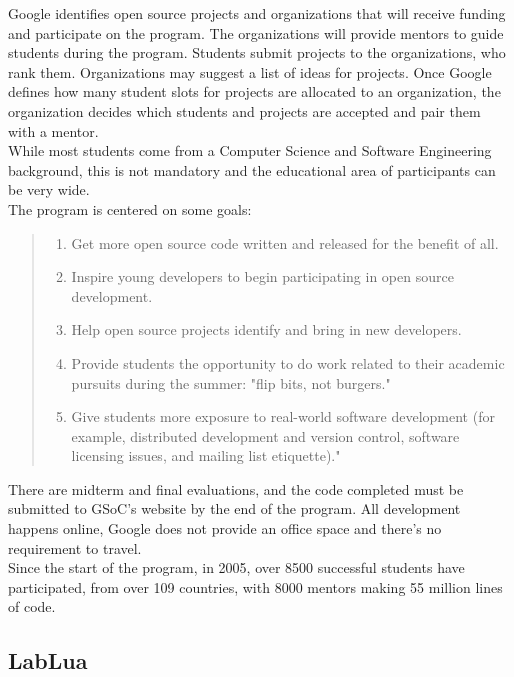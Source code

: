\documentclass{article}
\begin{document}
Google identifies open source projects and organizations that will receive funding and participate on the program. The organizations will provide mentors to guide students during the program. Students submit projects to the organizations, who rank them. Organizations may suggest a list of ideas for projects. Once Google defines how many student slots for projects are allocated to an organization, the organization decides which students and projects are accepted and pair them with a mentor.\\

While most students come from a Computer Science and Software Engineering background, this is not mandatory and the educational area of participants can be very wide.\\

The program is centered on some goals\autocite{gsocgoals}:
\begin{quote}\begin{enumerate}\item Get more open source code written and released for the benefit of all.
\item Inspire young developers to begin participating in open source development.
\item Help open source projects identify and bring in new developers.
\item Provide students the opportunity to do work related to their academic pursuits during the summer: "flip bits, not burgers."
\item Give students more exposure to real-world software development (for example, distributed development and version control, software licensing issues, and mailing list etiquette)."
	\end{enumerate}
\end{quote}

There are midterm and final evaluations, and the code completed must be submitted to GSoC's website by the end of the program. All development happens online, Google does not provide an office space and there's no requirement to travel.\\

Since the start of the program, in 2005, over 8500 successful students have participated, from over 109 countries, with 8000 mentors making 55 million lines of code.


\subsection{LabLua}
	
\end{document}
